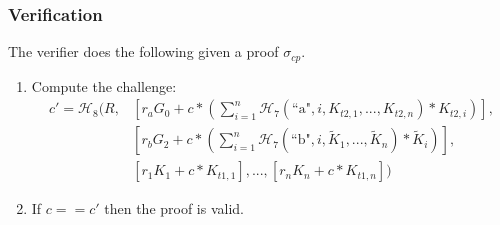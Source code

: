 \begin{appendices}
\subsubsection{Verification}

The verifier does the following given a proof $\sigma_{cp}$.

\begin{enumerate}
    \item Compute the challenge:
    \begin{align*}
        c' = \mathcal{H}_8(R, &[r_a G_0 + c*(\sum^n_{i=1} \mathcal{H}_7(\textrm{``a"}, i, K_{t2,1},...,K_{t2,n})*K_{t2,i})],\\
        &[r_b G_2 + c*(\sum^n_{i=1} \mathcal{H}_7(\textrm{``b"}, i, \tilde{K}_1,...,\tilde{K}_n)*\tilde{K}_i)],\\
        &[r_1 K_1 + c*K_{t1,1}],...,[r_n K_n + c*K_{t1,n}])
    \end{align*}

    \item If $c == c'$ then the proof is valid.
\end{enumerate}

\end{appendices}
